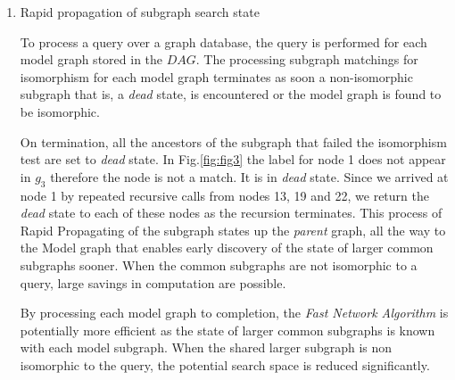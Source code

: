 \begin{enumerate}
\begin{enumerate}
\item{Rapid propagation of subgraph search state}

To process a query over a graph database, the query is performed for each model graph stored in the $DAG$. 
The processing subgraph matchings for isomorphism for each model graph terminates as soon a non-isomorphic subgraph that is, a \textit{dead} state, is encountered or the model graph is found to be isomorphic. 


On termination, all the ancestors of the subgraph that failed the isomorphism test are set to \textit{dead} state. 
In Fig.\ref{fig:fig3} the label for node 1 does not appear in $g_3$ therefore the node is not a match. 
It is in \textit{dead} state. Since we arrived at node 1 by repeated recursive calls from nodes 13, 19 and 22, we return the \textit{dead} state to each of these nodes as the recursion terminates. 
This process of Rapid Propagating of the subgraph states up the \textit{parent} graph, all the way to the Model graph that enables early discovery of the state of larger common subgraphs sooner. When the common subgraphs are not isomorphic to a query, large savings in computation are possible.

By processing each model graph to completion, the \textit{Fast Network Algorithm} is potentially more efficient as the state of larger common subgraphs is known with each model subgraph. When the shared larger subgraph is non isomorphic to the query, the potential search space is reduced significantly.





\end{enumerate}
\end{enumerate}
